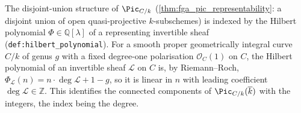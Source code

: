 The disjoint-union structure of \(\Pic_{C/k}\)
(\cref{thm:fga_pic_representability}: a disjoint union of open
quasi-projective \(k\)-subschemes) is indexed by the Hilbert polynomial
\(\Phi \in \mathbb{Q}[\lambda]\) of a representing invertible sheaf
(\texttt{def:hilbert\_polynomial}). For a smooth proper geometrically
integral curve \(C/k\) of genus \(g\) with a fixed degree-one polarisation
\(\mathcal{O}_C(1)\) on \(C\), the Hilbert polynomial of an invertible
sheaf \(\mathcal{L}\) on \(C\) is, by Riemann--Roch,
\(\Phi_{\mathcal{L}}(n) = n \cdot \deg \mathcal{L} + 1 - g\), so it is
linear in \(n\) with leading coefficient \(\deg \mathcal{L} \in
\mathbb{Z}\). This identifies the connected components of
\(\Pic_{C/k}(\overline k)\) with the integers, the index being the
degree.

\begin{definition}

  \label{def:divisor_degree_pic}


\end{definition}
